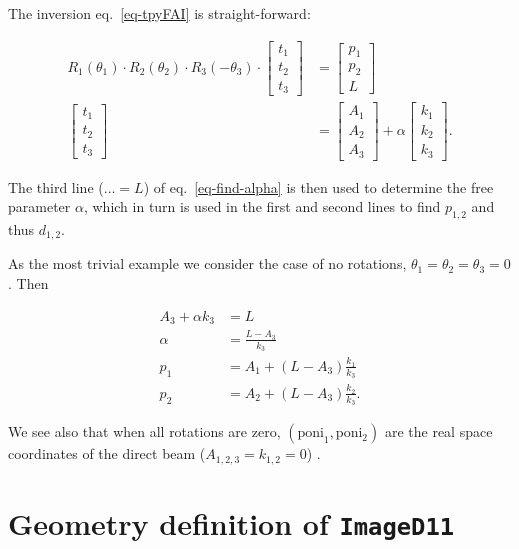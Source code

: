 \documentclass[12pt]{article}
\begin{document}
The inversion eq.~\ref{eq-tpyFAI} is straight-forward:

\begin{align}
  R_1(\theta_1)\cdot R_2(\theta_2) \cdot R_3(-\theta_3) \cdot
  \begin{bmatrix} t_1 \\ t_2 \\ t_3
  \end{bmatrix}
  & =
  \begin{bmatrix} p_1 \\ p_2 \\ L \end{bmatrix}
  \label{eq-find-alpha}
  \\
  \begin{bmatrix}
    t_1 \\ t_2 \\ t_3
  \end{bmatrix}
  & =
  \begin{bmatrix}
    A_1  \\ A_2 \\ A_3 
  \end{bmatrix}
  + \alpha
  \begin{bmatrix}
    k_1 \\ k_2 \\ k_3
  \end{bmatrix}.
\end{align}

The third line ($\ldots = L$) of eq.~\ref{eq-find-alpha} is then used
to determine the free parameter $\alpha$, which in turn is used in the
first and second lines to find $p_{1,2}$ and thus $d_{1,2}$.

As the most trivial example we consider the case of no rotations,
$\theta_1 = \theta_2 = \theta_3 = 0$. Then

\begin{align}
  A_3 + \alpha k_3 & = L \\
  \alpha & = \frac{L-A_3}{k_3} \\
  p_1 & = A_1 + (L-A_3) \frac{k_1}{k_3} \\
  p_2 & = A_2 + (L-A_3) \frac{k_2}{k_3}.
\end{align}

We see also that when all rotations are zero, $(\mathrm{poni}_1,
\mathrm{poni_2})$ are the real space coordinates of the direct beam
($A_{1,2,3}=k_{1,2}=0$) .

\section{Geometry definition of \texttt{ImageD11}}
\end{document}
